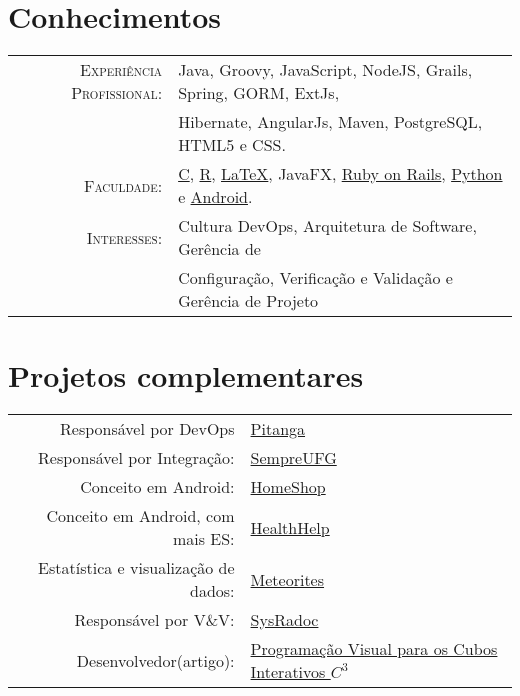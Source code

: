 \documentclass[a4paper,10pt]{article} %
\begin{document}
\section{Conhecimentos}

\begin{tabular}{rl}
	\textsc{Experiência Profissional:} &
	Java, Groovy, JavaScript, NodeJS, Grails, Spring, GORM, ExtJs, \\
	& Hibernate, AngularJs, Maven, PostgreSQL, HTML5 e CSS.\\

	\textsc{Faculdade:} &
	\href{https://bitbucket.org/Yuri-M-Dias/projeto-3/src}{C},
	\href{https://github.com/Yuri-M-Dias/meteorites}{R},
	\href{https://github.com/Yuri-M-Dias/curriculum}{\LaTeX},
	JavaFX, %
	\href{https://github.com/Yuri-M-Dias/LabWiki}{Ruby on Rails},
	\href{https://gist.github.com/Yuri-M-Dias/d7b69fd8bc873cdf6029af5dcb5a8a0f}{Python} e
	\href{https://github.com/Yuri-M-Dias/HealthHelp}{Android}.
	\\

	\textsc{Interesses:} & Cultura DevOps, Arquitetura de Software, Gerência de \\
	& Configuração, Verificação e Validação e Gerência de Projeto \\

\end{tabular}


\section{Projetos complementares}

\begin{tabular}{rl}
	Responsável por DevOps &
	\href{https://github.com/SaladaDeFrutas/Pitanga}{Pitanga} \\
	Responsável por Integração: &
	\href{https://github.com/ES-INF-UFG-2016-2/Sempre-UFG}{SempreUFG} \\
	Conceito em Android: &
	\href{https://github.com/Yuri-M-Dias/HomeShop}{HomeShop} \\
	Conceito em Android, com mais ES: &
	\href{https://github.com/Yuri-M-Dias/HealthHelp}{HealthHelp} \\
	Estatística e visualização de dados: &
	\href{https://github.com/Yuri-M-Dias/meteorites}{Meteorites} \\
	Responsável por V\&V: &
	\href{https://bitbucket.org/SysRadocTeam/sysradoc}{SysRadoc} \\

	Desenvolvedor(artigo): &
	\href{https://siimi.medialab.ufg.br/up/777/o/49_cubos_interativos.pdf}{Programação Visual para os Cubos Interativos $C^3$} \\


\end{tabular}
\end{document}
